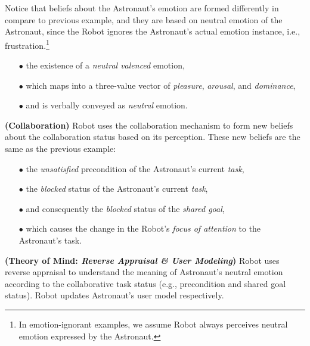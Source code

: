 \noindent Notice that beliefs about the Astronaut's emotion are formed
differently in compare to previous example, and they are based on neutral
emotion of the Astronaut, since the Robot ignores the Astronaut's actual
emotion instance, i.e., frustration.\footnote{In emotion-ignorant examples, we
assume Robot always perceives neutral emotion expressed by the Astronaut.}

\begin{itemize}
  \item[$\bullet$] the existence of a \textit{neutral valenced} emotion,
  \item[$\bullet$] which maps into a three-value vector of \textit{pleasure},
  \textit{arousal}, and \textit{dominance},
  \item[$\bullet$] and is verbally conveyed as \textit{neutral} emotion.\\
\end{itemize}

\noindent\textbf{(Collaboration)} Robot uses the collaboration mechanism to form
new beliefs about the collaboration status based on its perception. These new
beliefs are the same as the previous example:

\begin{itemize}
  \item[$\bullet$] the \textit{unsatisfied} precondition of the Astronaut's
  current \textit{task},
  \item[$\bullet$] the \textit{blocked} status of the Astronaut's current
  \textit{task},
  \item[$\bullet$] and consequently the \textit{blocked} status of the
  \textit{shared goal},
  \item[$\bullet$] which causes the change in the Robot's \textit{focus of
  attention} to the Astronaut's task.
\end{itemize}

\noindent\textbf{(Theory of Mind: \textit{Reverse Appraisal \& User Modeling})}
Robot uses reverse appraisal to understand the meaning of Astronaut's neutral
emotion according to the collaborative task status (e.g., precondition and
shared goal status). Robot updates Astronaut's user model respectively.\\


